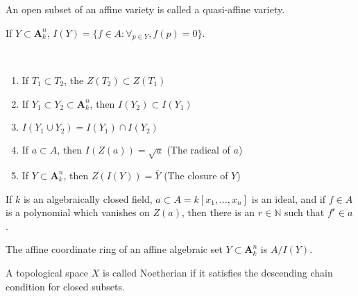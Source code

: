                 \begin{definition}
                    An open subset of an affine variety
                    is called a quasi-affine variety.
                \end{definition}
                If $Y\subset\textbf{A}_{k}^{n}$,
                $I(Y)=\{f\in A:\forall_{p\in Y},f(p)=0\}$.
                \begin{theorem}
                    \
                    \begin{enumerate}
                        \item If $T_1\subset T_2$,
                              the $Z(T_2)\subset{Z}(T_1)$
                        \item If
                              $Y_{1}\subset{Y_{2}}\subset%
                              \textbf{A}_{k}^{n}$,
                              then $I(Y_{2})\subset{I}(Y_{1})$
                        \item $I(Y_{1}\cup{Y_{2}})%
                               =I(Y_{1})\cap{I}(Y_{2})$
                        \item If $a\subset A$,
                              then $I(Z(a))=\sqrt{a}$
                              (The radical of $a$)
                        \item If $Y\subset\textbf{A}_{k}^{n}$,
                              then $Z(I(Y))=\overline{Y}$
                              (The closure of $Y$)
                    \end{enumerate}
                \end{theorem}
                \begin{theorem}
                    If $k$ is an algebraically closed field,
                    $a\subset{A}=k[x_{1},\hdots,x_{n}]$
                    is an ideal, and if $f\in{A}$ is a polynomial
                    which vanishes on $Z(a)$, then there is an
                    $r\in\mathbb{N}$ such that $f^{r}\in{a}$.
                \end{theorem}
                \begin{definition}
                    The affine coordinate ring of an affine
                    algebraic set $Y\subset\textbf{A}_{k}^{n}$
                    is $A/I(Y)$.
                \end{definition}
                \begin{definition}
                    A topological space $X$ is called Noetherian
                    if it satisfies the descending chain condition
                    for closed subsets.
                \end{definition}
